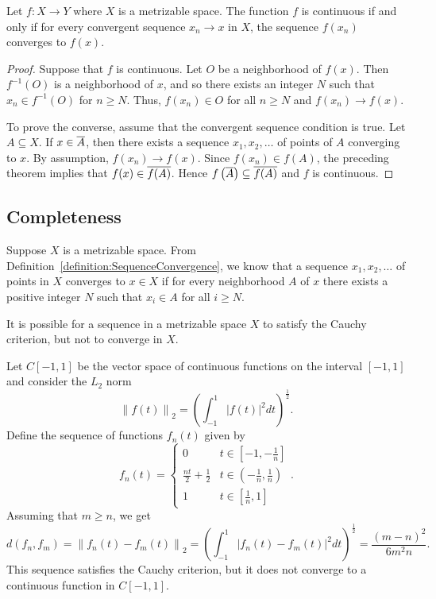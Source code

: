 \begin{theorem}
Let $f: X \rightarrow Y$ where $X$ is a metrizable space.
The function $f$ is continuous if and only if for every convergent sequence $x_n \rightarrow x$ in $X$, the sequence $f(x_n)$ converges to $f(x)$.
\end{theorem}
\begin{proof}
Suppose that $f$ is continuous.
Let $O$ be a neighborhood of $f(x)$.
Then $f^{-1}(O)$ is a neighborhood of $x$, and so there exists an integer $N$ such that $x_n \in f^{-1}(O)$ for $n \geq N$.
Thus, $f(x_n) \in O$ for all $n \geq N$ and $f(x_n) \rightarrow f(x)$.

To prove the converse, assume that the convergent sequence condition is true.
Let $A \subseteq X$.
If $x \in \overline{A}$, then there exists a sequence $x_1, x_2, \ldots$ of points of $A$ converging to $x$.
By assumption, $f(x_n) \rightarrow f(x)$.
Since $f(x_n) \in f(A)$, the preceding theorem implies that $f(x) \in \overline{f(A)}$.
Hence $f \left( \overline{A} \right) \subseteq \overline{f(A)}$ and $f$ is continuous.
\end{proof}


\subsection{Completeness}

Suppose $X$ is a metrizable space.
From Definition~\ref{definition:SequenceConvergence}, we know that a sequence $x_1, x_2, \ldots$ of points in $X$ converges to $x \in X$ if for every neighborhood $A$ of $x$ there exists a positive integer $N$ such that $x_i \in A$ for all $i \geq N$.

It is possible for a sequence in a metrizable space $X$ to satisfy the Cauchy criterion, but not to converge in $X$.

\begin{example}
Let $C[-1,1]$ be the vector space of continuous functions on the interval $[-1,1]$ and consider the $L_2$ norm
\begin{equation*}
\left\| f(t) \right\|_2 = \left( \int_{-1}^1 |f(t)|^2 dt \right)^{\frac{1}{2}}.
\end{equation*}
Define the sequence of functions $f_n(t)$ given by
\begin{equation*}
f_n(t) = \left\{ \begin{array}{ll}
0 & t \in \left[ -1, -\frac{1}{n} \right] \\
\frac{nt}{2} + \frac{1}{2} & t \in \left( -\frac{1}{n}, \frac{1}{n} \right) \\
1 & t \in \left[ \frac{1}{n}, 1 \right]
\end{array} \right. .
\end{equation*}
Assuming that $m \geq n$, we get
\begin{equation*}
d(f_n, f_m) = \left\| f_n(t) - f_m(t) \right\|_2
= \left( \int_{-1}^1 |f_n(t) - f_m(t)|^2 dt \right)^{\frac{1}{2}}
= \frac{(m-n)^2}{6m^2n}.
\end{equation*}
This sequence satisfies the Cauchy criterion, but it does not converge to a continuous function in $C[-1,1]$.
\end{example}

